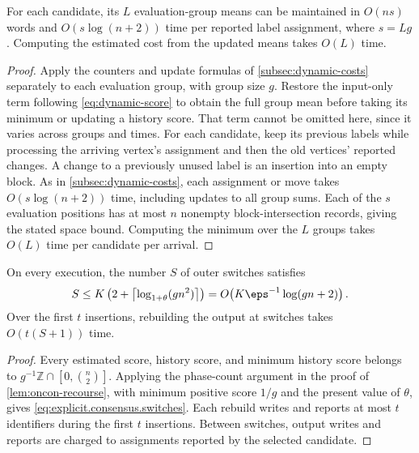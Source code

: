 \begin{lemma}\label{lem:explicit.cost.maintenance}
For each candidate, its $ L $ evaluation-group means can be maintained in $ O(ns) $ words and $ O(s\log(n+2)) $ time per reported label assignment, where $ s=Lg $.
Computing the estimated cost from the updated means takes $ O(L) $ time.
\end{lemma}
\begin{proof}
Apply the counters and update formulas of \cref{subsec:dynamic-costs} separately to each evaluation group, with group size $ g $.
Restore the input-only term following \eqref{eq:dynamic-score} to obtain the full group mean before taking its minimum or updating a history score.
That term cannot be omitted here, since it varies across groups and times.
For each candidate, keep its previous labels while processing the arriving vertex's assignment and then the old vertices' reported changes.
A change to a previously unused label is an insertion into an empty block.
As in \cref{subsec:dynamic-costs}, each assignment or move takes $ O(s\log(n+2)) $ time, including updates to all group sums.
Each of the $ s $ evaluation positions has at most $ n $ nonempty block-intersection records, giving the stated space bound.
Computing the minimum over the $ L $ groups takes $ O(L) $ time per candidate per arrival.
\end{proof}

\begin{lemma}\label{lem:explicit.rebuilding}
On every execution, the number $ S $ of outer switches satisfies
\begin{align}
    S\le K\left(2+\left\lceil\log_{1+\theta}(gn^2)\right\rceil\right)
    =O\!\left(K\eps^{-1}\log(gn+2)\right).
    \label{eq:explicit.consensus.switches}
\end{align}
Over the first $ t $ insertions, rebuilding the output at switches takes $ O(t(S+1)) $ time.
\end{lemma}
\begin{proof}
Every estimated score, history score, and minimum history score belongs to $ g^{-1}\mathbb Z\cap[0,\binom n2] $.
Applying the phase-count argument in the proof of \cref{lem:oncon-recourse}, with minimum positive score $ 1/g $ and the present value of $ \theta $, gives \eqref{eq:explicit.consensus.switches}.
Each rebuild writes and reports at most $ t $ identifiers during the first $ t $ insertions.
Between switches, output writes and reports are charged to assignments reported by the selected candidate.
\end{proof}

